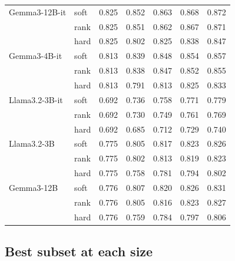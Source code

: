 \begin{table}[h]
\begin{tabular}{l l c c c c c}
    Gemma3-12B-it & soft & 0.825 & 0.852 & 0.863 & 0.868 & 0.872 \\
     & rank & 0.825 & 0.851 & 0.862 & 0.867 & 0.871 \\
     & hard & 0.825 & 0.802 & 0.825 & 0.838 & 0.847 \\
    Gemma3-4B-it & soft & 0.813 & 0.839 & 0.848 & 0.854 & 0.857 \\
     & rank & 0.813 & 0.838 & 0.847 & 0.852 & 0.855 \\
     & hard & 0.813 & 0.791 & 0.813 & 0.825 & 0.833 \\
    Llama3.2-3B-it & soft & 0.692 & 0.736 & 0.758 & 0.771 & 0.779 \\
     & rank & 0.692 & 0.730 & 0.749 & 0.761 & 0.769 \\
     & hard & 0.692 & 0.685 & 0.712 & 0.729 & 0.740 \\
    Llama3.2-3B & soft & 0.775 & 0.805 & 0.817 & 0.823 & 0.826 \\
     & rank & 0.775 & 0.802 & 0.813 & 0.819 & 0.823 \\
     & hard & 0.775 & 0.758 & 0.781 & 0.794 & 0.802 \\
    Gemma3-12B & soft & 0.776 & 0.807 & 0.820 & 0.826 & 0.831 \\
     & rank & 0.776 & 0.805 & 0.816 & 0.823 & 0.827 \\
     & hard & 0.776 & 0.759 & 0.784 & 0.797 & 0.806 \\
    \hline
  \end{tabular}
\end{table}

\subsection{Best subset at each size}

